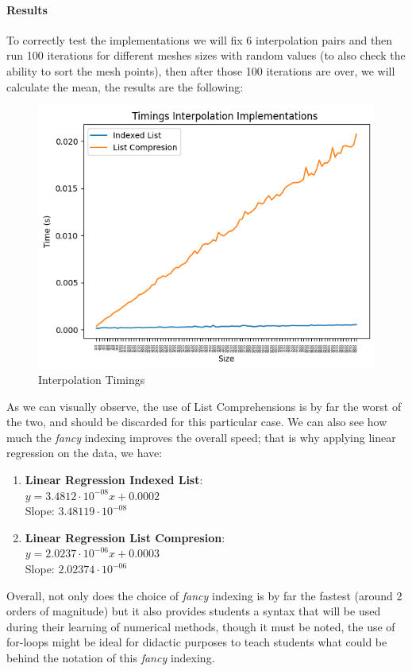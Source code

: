 \paragraph{Results}
To correctly test the implementations we will fix 6 interpolation pairs and then run 100 iterations for different meshes sizes with random values (to also check the ability to sort the mesh points), then after those 100 iterations are over, we will calculate the mean, the results are the following:
\begin{figure}[H]
    \centering
    \includegraphics[scale=0.9]{Include/Images/Thesis/Analysis of Solutions/Interpolation/Interpolation Timings.png}
    \caption{Interpolation Timings}
    \label{fig:Interpolation Timings}
\end{figure}

As we can visually observe, the use of List Comprehensions is by far the worst of the two, and should be discarded for this particular case. We can also see how much the \textit{fancy} indexing improves the overall speed; that is why applying linear regression on the data, we have:
\begin{enumerate}
    \item \textbf{Linear Regression Indexed List}: \\
        $y = 3.4812\cdot10^{-08}x + 0.0002$ \\
        Slope: $3.48119\cdot10^{-08}$
    \item \textbf{Linear Regression List Compresion}: \\
        $y = 2.0237\cdot10^{-06}x + 0.0003$ \\
        Slope: $2.02374\cdot10^{-06}$
\end{enumerate}

Overall, not only does the choice of \textit{fancy} indexing is by far the fastest (around 2 orders of magnitude) but it also provides students a syntax that will be used during their learning of numerical methods, though it must be noted, the use of for-loops might be ideal for didactic purposes to teach students what could be behind the notation of this \textit{fancy} indexing.




